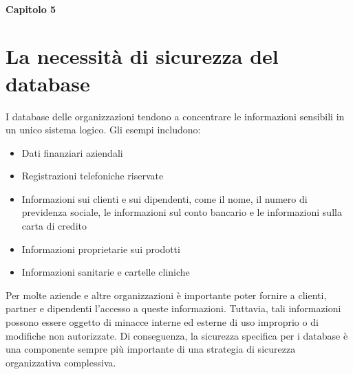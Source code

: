 \paragraph*{Capitolo 5}
\section{La necessità di sicurezza del database}
I database delle organizzazioni tendono a concentrare le informazioni sensibili in un unico sistema logico. Gli esempi includono:
\begin{itemize}
    \item Dati finanziari aziendali
    
    \item Registrazioni telefoniche riservate
    
    \item Informazioni sui clienti e sui dipendenti, come il nome, il numero di previdenza sociale, le informazioni sul conto bancario e le informazioni sulla carta di credito
    
    \item Informazioni proprietarie sui prodotti
    
    \item Informazioni sanitarie e cartelle cliniche 
\end{itemize}
Per molte aziende e altre organizzazioni è importante poter fornire a clienti, partner e dipendenti l'accesso a queste informazioni. Tuttavia, tali informazioni possono essere oggetto di minacce interne ed esterne di uso improprio o di modifiche non autorizzate. Di conseguenza, la sicurezza specifica per i database è una componente sempre più importante di una strategia di sicurezza organizzativa complessiva. 

\singlespacing

